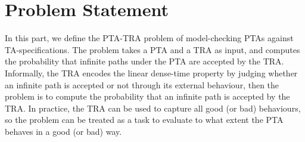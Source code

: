 \vspace{-1.8em}
\section{Problem Statement}
\vspace{-1em}
In this part, we define the {\sc PTA-TRA} problem of model-checking {PTAs} against TA-specifications.
The problem takes a PTA and a TRA as input, and computes the probability that infinite paths under the PTA are accepted by the TRA.
Informally, the TRA encodes the linear dense-time property by judging whether an infinite path is accepted or not through its external behaviour,
then the problem is to compute the probability that an infinite path is accepted by the TRA.
In practice, the TRA can be used to capture all good (or bad) behaviours, so the problem can be treated as a task to evaluate to what extent the PTA behaves in a good (or bad) way.

